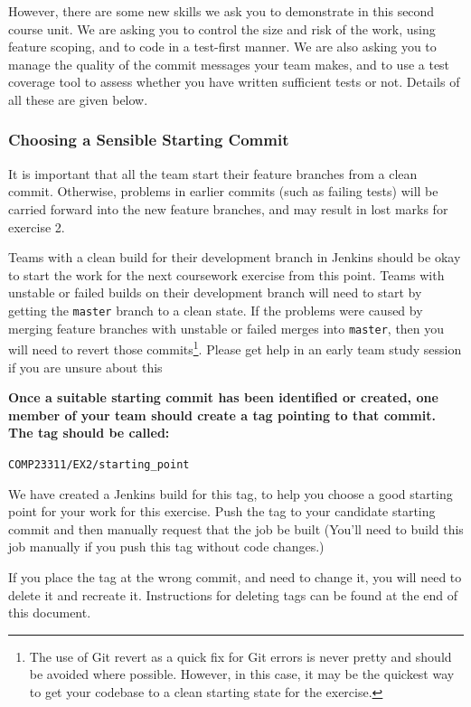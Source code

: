 \documentclass[
]{book}
\begin{document}
However, there are some new skills we ask you to demonstrate in this second course unit. We are asking you to control the size and risk of the work, using feature scoping, and to code in a test-first manner. We are also asking you to manage the quality of the commit messages your team makes, and to use a test coverage tool to assess whether you have written sufficient tests or not. Details of all these are given below.

\hypertarget{sensible}{%
\subsubsection*{Choosing a Sensible Starting Commit}\label{sensible}}

It is important that all the team start their feature branches from a clean commit. Otherwise, problems in earlier commits (such as failing tests) will be carried forward into the new feature branches, and may result in lost marks for exercise 2.

Teams with a clean build for their development branch in Jenkins should be okay to start the work for the next coursework exercise from this point. Teams with unstable or failed builds on their development branch will need to start by getting the \texttt{master} branch to a clean state. If the problems were caused by merging feature branches with unstable or failed merges into \texttt{master}, then you will need to revert those commits\footnote{The use of Git revert as a quick fix for Git errors is never pretty and should be avoided where possible. However, in this case, it may be the quickest way to get your codebase to a clean starting state for the exercise.}. Please get help in an early team study session if you are unsure about this

\textbf{Once a suitable starting commit has been identified or created, one member of your team should create a tag pointing to that commit. The tag should be called:}

\texttt{COMP23311/EX2/starting\_point}

We have created a Jenkins build for this tag, to help you choose a good starting point for your work for this exercise. Push the tag to your candidate starting commit and then manually request that the job be built (You'll need to build this job manually if you push this tag without code changes.)

If you place the tag at the wrong commit, and need to change it, you will need to delete it and recreate it. Instructions for deleting tags can be found at the end of this document.
\end{document}
